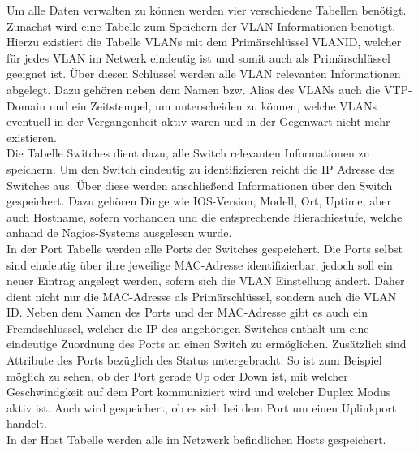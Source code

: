 Um alle Daten verwalten zu können werden vier verschiedene Tabellen benötigt.\\
Zunächst wird eine Tabelle zum Speichern der VLAN-Informationen benötigt.
Hierzu existiert die Tabelle VLANs mit dem Primärschlüssel VLANID, welcher für jedes VLAN im Netwerk eindeutig ist und somit auch als Primärschlüssel geeignet ist. Über diesen Schlüssel werden alle VLAN relevanten Informationen abgelegt. Dazu gehören neben dem Namen bzw. Alias des VLANs auch die VTP-Domain und ein Zeitstempel, um unterscheiden zu können, welche VLANs eventuell in der Vergangenheit aktiv waren und in der Gegenwart nicht mehr existieren.\\
Die Tabelle Switches dient dazu, alle Switch relevanten Informationen zu speichern. 
Um den Switch eindeutig zu identifizieren reicht die IP Adresse des Switches aus. Über diese werden anschließend Informationen über den Switch gespeichert. Dazu gehören Dinge wie IOS-Version, Modell, Ort, Uptime, aber auch Hostname, sofern vorhanden und die entsprechende Hierachiestufe, welche anhand de Nagios-Systems ausgelesen wurde.\\
In der Port Tabelle werden alle Ports der Switches gespeichert. Die Ports selbst sind eindeutig über ihre jeweilige MAC-Adresse identifizierbar, jedoch soll ein neuer Eintrag angelegt werden, sofern sich die VLAN Einstellung ändert.
Daher dient nicht nur die MAC-Adresse als Primärschlüssel, sondern auch die VLAN ID.
Neben dem Namen des Ports und der MAC-Adresse gibt es auch ein Fremdschlüssel, welcher die IP des angehörigen Switches enthält um eine eindeutige Zuordnung des Ports an einen Switch zu ermöglichen.
Zusätzlich sind Attribute des Ports bezüglich des Status untergebracht.
So ist zum Beispiel möglich zu sehen, ob der Port gerade Up oder Down ist, mit welcher Geschwindgkeit auf dem Port kommuniziert wird und welcher Duplex Modus aktiv ist. Auch wird gespeichert, ob es sich bei dem Port um einen Uplinkport handelt.\\
In der Host Tabelle werden alle im Netzwerk befindlichen Hosts gespeichert.
